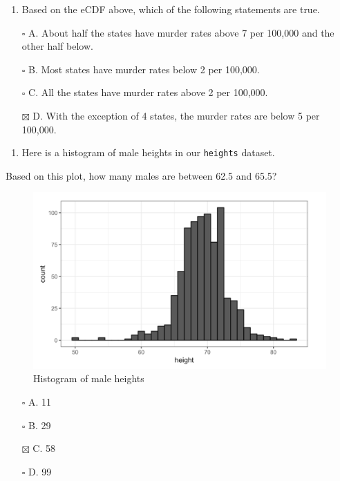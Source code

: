 \documentclass[
]{article}
\providecommand{\tightlist}{%
  \setlength{\itemsep}{0pt}\setlength{\parskip}{0pt}}
\begin{document}
\begin{enumerate}
\def\labelenumi{\arabic{enumi}.}
\setcounter{enumi}{5}
\tightlist
\item
  Based on the eCDF above, which of the following statements are true.
\end{enumerate}

\begin{itemize}
\tightlist
\item[$\square$]
  A. About half the states have murder rates above 7 per 100,000 and the
  other half below.
\item[$\square$]
  B. Most states have murder rates below 2 per 100,000.
\item[$\square$]
  C. All the states have murder rates above 2 per 100,000.
\item[$\boxtimes$]
  D. With the exception of 4 states, the murder rates are below 5 per
  100,000.
\end{itemize}

\newpage

\begin{enumerate}
\def\labelenumi{\arabic{enumi}.}
\setcounter{enumi}{6}
\tightlist
\item
  Here is a histogram of male heights in our \texttt{heights} dataset.
\end{enumerate}

Based on this plot, how many males are between 62.5 and 65.5?

\begin{figure}
\centering
\includegraphics{images/Histogram of male heights.png}
\caption{Histogram of male heights}
\end{figure}

\begin{itemize}
\tightlist
\item[$\square$]
  A. 11
\item[$\square$]
  B. 29
\item[$\boxtimes$]
  C. 58
\item[$\square$]
  D. 99
\end{itemize}
\end{document}
